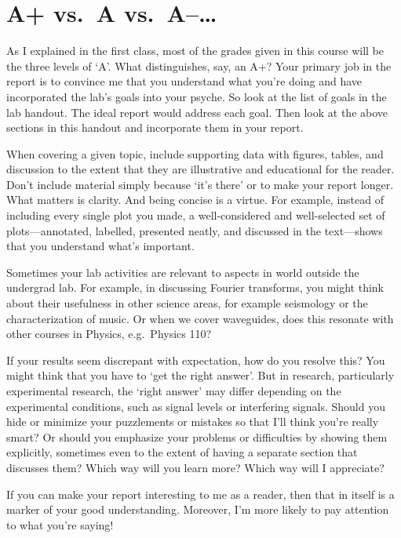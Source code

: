 \documentclass[12pt,preprint]{aastex}
\begin{document}
\section{A+ vs.\ A vs.\ A--\dots}

As I explained in the first class, most of the grades given in this
 course will be the three levels of `A'. What distinguishes, say, an A+?
 Your primary job in the report is to convince me that you understand
 what you're doing and have incorporated the lab's goals into your
 psyche.  So look at the list of goals in the lab handout. The ideal
 report would address each goal. Then look at the above sections in this
 handout and incorporate them in your report.

When covering a given topic, include supporting data with figures,
 tables, and discussion to the extent that they are illustrative and
 educational for the reader. Don't include material simply because `it's
 there' or to make your report longer. What matters is clarity. And
 being concise is a virtue. For example, instead of including every
single plot you made, a well-considered and
 well-selected set of plots---annotated, labelled, presented neatly, and
discussed in the text---shows that you understand what's important.

Sometimes your lab activities are relevant to aspects in world outside
 the undergrad lab. For example, in discussing Fourier transforms, you
 might think about their usefulness in other science areas, for example
 seismology or the characterization of music. Or when we cover
 waveguides, does this resonate with other courses in Physics,
 e.g.\ Physics 110?

If your results seem discrepant with expectation, how do you resolve
this? You might think that  you have to `get the right answer'. But in
research, particularly experimental research, the `right answer' may
differ depending on the experimental conditions, such as signal levels
or interfering signals. Should you hide or minimize your puzzlements or
mistakes so that I'll think you're really smart? Or should you emphasize
your problems or difficulties  by showing them explicitly, sometimes
even to the extent of having a separate section that discusses them?
Which way will you learn more? Which way will I appreciate?

If you can make your report interesting to me as a reader, then that in
 itself is a marker of your good understanding. Moreover, I'm more
 likely to pay attention to what you're saying!
\end{document}
